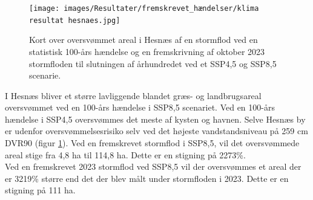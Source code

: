 \begin{figure}[H]
    \centering
    \texttt{[image: images/Resultater/fremskrevet\_hændelser/klima resultat hesnaes.jpg]}
    \caption{Kort over oversvømmet areal i Hesnæs af en stormflod ved en statistisk 100-års hændelse og en fremskrivning af oktober 2023 stormfloden til slutningen af århundredet ved et SSP4,5 og SSP8,5 scenarie.}
    \label{Figur: Klima Hesnæs}
\end{figure}
I Hesnæs bliver et større lavliggende blandet græs- og landbrugsareal oversvømmet ved en 100-års hændelse i SSP8,5 scenariet. Ved en 100-års hændelse i SSP4,5 oversvømmes det meste af kysten og havnen. Selve Hesnæs by er udenfor oversvømmelsesrisiko selv ved det højeste vandstandsniveau på 259 cm DVR90 (figur \ref{Figur: Klima Hesnæs}). Ved en fremskrevet stormflod i SSP8,5, vil det oversvømmede areal stige fra 4,8 ha til 114,8 ha. Dette er en stigning på 2273\%. \\
Ved en fremskrevet 2023 stormflod ved SSP8,5 vil der oversvømmes et areal der er 3219\% større end det der blev målt under stormfloden i 2023. Dette er en stigning på 111 ha. \\

